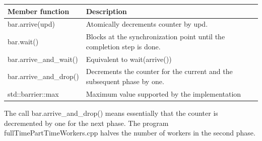 \begin{table}[H]
\centering
\begin{tabular}{ll}
Member function         & Description                                   \\ \hline
bar.arrive(upd)         & Atomically decrements counter by upd.         \\
bar.wait()              & Blocks at the synchronization point until the completion step is done.  \\
bar.arrive\_and\_wait() & Equivalent to wait(arrive())                  \\
bar.arrive\_and\_drop() & Decrements the counter for the current and the subsequent phase by one. \\
std::barrier::max       & Maximum value supported by the implementation
\end{tabular}
\end{table}

The call bar.arrive\_and\_drop() means essentially that the counter is decremented by one for the next phase. The program fullTimePartTimeWorkers.cpp halves the number of workers in the second phase.

